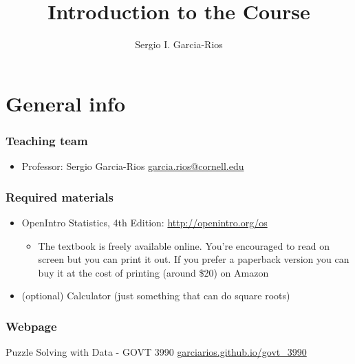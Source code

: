 \documentclass[11pt]{beamer}
\author{Sergio I. Garcia-Rios}
\title{Introduction to the Course}
\institute{Government 3990: Statistics in the Social Science}
\date{}
\begin{document}
\maketitle


\section{General info}


\begin{frame}
\frametitle{Teaching team}

\begin{itemize}

\item Professor: Sergio Garcia-Rios \url{garcia.rios@cornell.edu}


\end{itemize}

\end{frame}


\begin{frame}
\frametitle{Required materials}

\begin{itemize}

\item OpenIntro Statistics, 4th Edition: \url{http://openintro.org/os}

\begin{itemize}
\item The textbook is freely available online. You're encouraged to read on screen but you can print it out. If you prefer a paperback version you can buy it at the cost of printing (around \$20) on Amazon
\end{itemize}

\item (optional) Calculator (just something that can do square roots)

\end{itemize}

\end{frame}


\begin{frame}
\frametitle{Webpage}


\centering
{\Large Puzzle Solving with Data - GOVT 3990
\url{garciarios.github.io/govt_3990} 
}

\end{frame}
\end{document}
